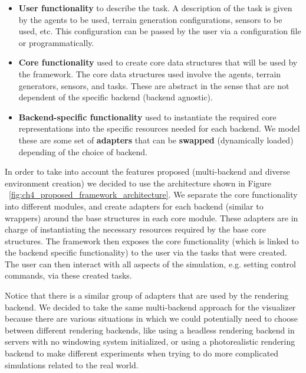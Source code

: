 \begin{itemize}
    \item \textbf{User functionality} to describe the task. A description of the task is given by 
          the agents to be used, terrain generation configurations, sensors to be used, etc. This configuration
          can be passed by the user via a configuration file or programmatically.
    \item \textbf{Core functionality} used to create core data structures that will be used by the framework.
          The core data structures used involve the agents, terrain generators, sensors, and tasks. These are
          abstract in the sense that are not dependent of the specific backend (backend agnostic).
    \item \textbf{Backend-specific functionality} used to instantiate the required core representations
          into the specific resources needed for each backend. We model these are some set of \textbf{adapters}
          that can be \textbf{swapped} (dynamically loaded) depending of the choice of backend.
\end{itemize}

\figFrameworkFlow

In order to take into account the features proposed (multi-backend and diverse environment
creation) we decided to use the architecture shown in Figure ~\ref{fig:ch4_proposed_framework_architecture}. 
We separate the core functionality into different modules, and create adapters for 
each backend (similar to wrappers) around the base structures in each core module. 
These adapters are in charge of instantiating the necessary resources required by the 
base core structures. The framework then exposes the core functionality (which is linked 
to the backend specific functionality) to the user via the tasks that were created. 
The user can then interact with all aspects of the simulation, e.g. setting control 
commands, via these created tasks.

Notice that there is a similar group of adapters that are used by the rendering backend. We
decided to take the same multi-backend approach for the visualizer because there are various situations
in which we could potentially need to choose between different rendering backends, like using a 
headless rendering backend in servers with no windowing system initialized, or using a photorealistic
rendering backend to make different experiments when trying to do more complicated simulations related to
the real world.

